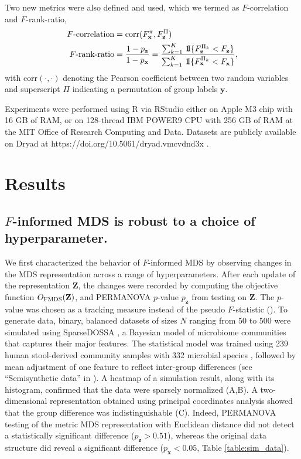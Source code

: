 \documentclass[10pt,letterpaper]{article}
\newcommand{\1}{{\rm 1}\kern-0.24em{\rm I}}
\begin{document}
Two new metrics were also defined and used, which we termed as $F$-correlation and $F$-rank-ratio,
\begin{equation}
\begin{aligned}
    F\text{-correlation} &= \text{corr}(F_\mathbf{x}^\pi, F_\mathbf{z}^\Pi) \\
    F\text{-rank-ratio} &= \frac{1-p_\mathbf{z}}{1-p_\mathbf{x}} = \frac{\sum_{k=1}^K\,\1\{F_\mathbf{z}^{\Pi_k} < F_\mathbf{z}\}}{\sum_{k=1}^K\,\1\{F_\mathbf{x}^{\Pi_k} < F_\mathbf{x}\}},
    \label{eq:def_f_metrics}
\end{aligned}
\end{equation}
with $\text{corr}(\cdot,\cdot)$ denoting the Pearson coefficient between two random variables and superscript $\Pi$ indicating a permutation of group labels $\mathbf{y}$.

Experiments were performed using R via RStudio either on Apple M3 chip with 16 GB of RAM, or on 128-thread IBM POWER9 CPU with 256 GB of RAM at the MIT Office of Research Computing and Data. Datasets are publicly available on Dryad at https://doi.org/10.5061/dryad.vmcvdnd3x \cite{Kim25}.



\section*{Results}
\subsection*{$F$-informed MDS is robust to a choice of hyperparameter.}
We first characterized the behavior of $F$-informed MDS by observing changes in the MDS representation across a range of hyperparameters. After each update of the representation $\mathbf{Z}$, the changes were recorded by computing the objective function $O_{\rm FMDS}(\mathbf{Z})$, and PERMANOVA $p$-value $p_\mathbf{z}$ from testing on $\mathbf{Z}$. The $p$-value was chosen as a tracking measure instead of the pseudo $F$-statistic (). To generate data, binary, balanced datasets of sizes $N$ ranging from 50 to 500 were simulated using SparseDOSSA \cite{Ma21}, a Bayesian model of microbiome communities that captures their major features. The statistical model was trained using 239 human stool-derived community samples with 332 microbial species \cite{Lloyd17}, followed by mean adjustment of one feature to reflect inter-group differences (see ``Semisynthetic data'' in ). A heatmap of a simulation result, along with its histogram, confirmed that the data were sparsely normalized (A,B). A two-dimensional representation obtained using principal coordinates analysis showed that the group difference was indistinguishable (C). Indeed, PERMANOVA testing of the metric MDS representation with Euclidean distance did not detect a statistically significant difference ($p_\mathbf{z}>0.51$), whereas the original data structure did reveal a significant difference ($p_\mathbf{x}<0.05$, Table \ref{table:sim_data}).
\end{document}
